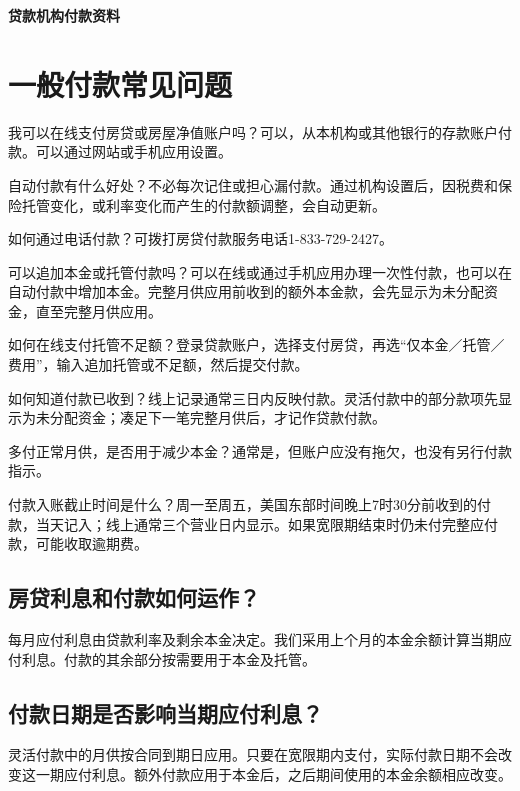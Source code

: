 \documentclass[UTF8,fontset=none,11pt,a4paper]{ctexart}
\begin{document}
{\noindent\fontsize{20}{25}\selectfont\bfseries 贷款机构付款资料\par}
\vspace{10pt}
\section*{一般付款常见问题}
我可以在线支付房贷或房屋净值账户吗？可以，从本机构或其他银行的存款账户付款。可以通过网站或手机应\allowbreak\mbox{用设置。}


自动付款有什么好处？不必每次记住或担心漏付款。通过机构设置后，因税费和保险托管变化，或利率变化而产生的付款额调整，会\allowbreak\mbox{自动更新。}


如何通过电话付款？可拨打房贷付款服务电话1-833-729-2427。


可以追加本金或托管付款吗？可以在线或通过手机应用办理一次性付款，也可以在自动付款中增加本金。完整月供应用前收到的额外本金款，会先显示为未分配资金，直至完整\allowbreak\mbox{月供应用。}


如何在线支付托管不足额？登录贷款账户，选择支付房贷，再选“仅本金／托管／费用”，输入追加托管或不足额，然后\allowbreak\mbox{提交付款。}


如何知道付款已收到？线上记录通常三日内反映付款。灵活付款中的部分款项先显示为未分配资金；凑足下一笔完整月供后，才记作\allowbreak\mbox{贷款付款。}


多付正常月供，是否用于减少本金？通常是，但账户应没有拖欠，也没有另行\allowbreak\mbox{付款指示。}


付款入账截止时间是什么？周一至周五，美国东部时间晚上7时30分前收到的付款，当天记入；线上通常三个营业日内显示。如果宽限期结束时仍未付完整应付款，可能收\allowbreak\mbox{取逾期费。}


\subsection*{房贷利息和付款如何运作？}
每月应付利息由贷款利率及剩余本金决定。我们采用上个月的本金余额计算当期应付利息。付款的其余部分按需要用于本\allowbreak\mbox{金及托管。}


\subsection*{付款日期是否影响当期应付利息？}
灵活付款中的月供按合同到期日应用。只要在宽限期内支付，实际付款日期不会改变这一期应付利息。额外付款应用于本金后，之后期间使用的本金余额\allowbreak\mbox{相应改变。}
\end{document}
